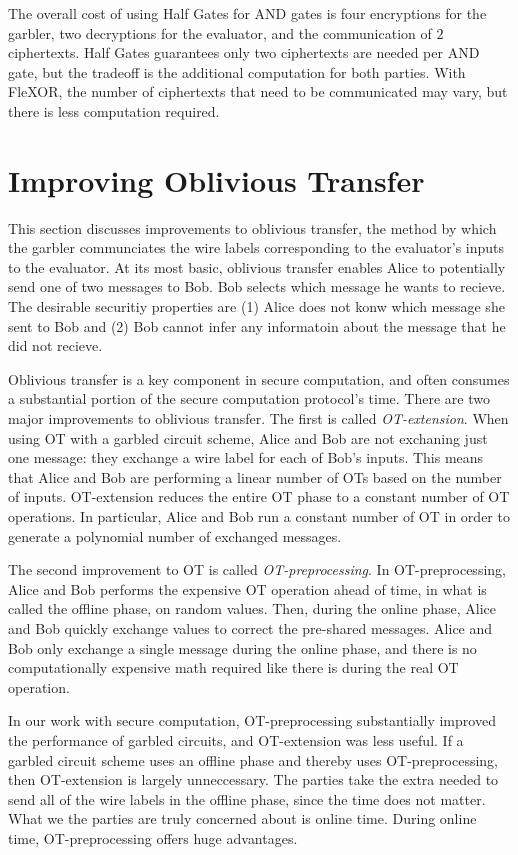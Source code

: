 The overall cost of using Half Gates for AND gates is four encryptions for the garbler, two decryptions for the evaluator, and the communication of $2$ ciphertexts. 
Half Gates guarantees only two ciphertexts are needed per AND gate, but the tradeoff is the additional computation for both parties.
With FleXOR, the number of ciphertexts that need to be communicated may vary, but there is less computation required.

\section{Improving Oblivious Transfer}
This section discusses improvements to oblivious transfer, the method by which the garbler communciates the wire labels corresponding to the evaluator's inputs to the evaluator.
At its most basic, oblivious transfer enables Alice to potentially send one of two messages to Bob.
Bob selects which message he wants to recieve.
The desirable securitiy properties are (1) Alice does not konw which message she sent to Bob and (2) Bob cannot infer any informatoin about the message that he did not recieve.

Oblivious transfer is a key component in secure computation, and often consumes a substantial portion of the secure computation protocol's time.
There are two major improvements to oblivious transfer.
The first is called \textit{OT-extension}.
When using OT with a garbled circuit scheme, Alice and Bob are not exchaning just one message: they exchange a wire label for each of Bob's inputs.
This means that Alice and Bob are performing a linear number of OTs based on the number of inputs.
OT-extension reduces the entire OT phase to a constant number of OT operations.
In particular, Alice and Bob run a constant number of OT in order to generate a polynomial number of exchanged messages.

The second improvement to OT is called \textit{OT-preprocessing}.
In OT-preprocessing, Alice and Bob performs the expensive OT operation ahead of time, in what is called the offline phase, on random values.
Then, during the online phase, Alice and Bob quickly exchange values to correct the pre-shared messages.
Alice and Bob only exchange a single message during the online phase, and there is no computationally expensive math required like there is during the real OT operation.

In our work with secure computation, OT-preprocessing substantially improved the performance of garbled circuits, and OT-extension was less useful.
If a garbled circuit scheme uses an offline phase and thereby uses OT-preprocessing, then OT-extension is largely unneccessary.
The parties take the extra needed to send all of the wire labels in the offline phase, since the time does not matter.
What we the parties are truly concerned about is online time.
During online time, OT-preprocessing offers huge advantages.


